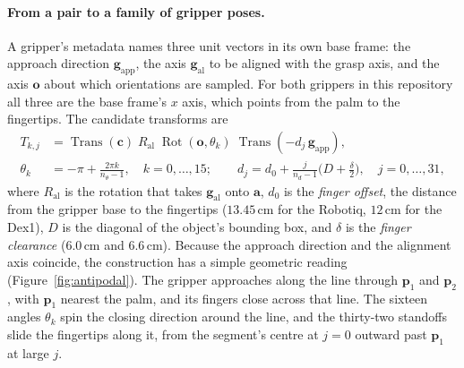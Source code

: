 \documentclass{article}
\begin{document}
\paragraph{From a pair to a family of gripper poses.}
A gripper's metadata names three unit vectors in its own base frame: the approach direction $\bm g_{\mathrm{app}}$, the axis $\bm g_{\mathrm{al}}$ to be aligned with the grasp axis, and the axis $\bm o$ about which orientations are sampled. For both grippers in this repository all three are the base frame's $x$ axis, which points from the palm to the fingertips. The candidate transforms are
\begin{align}
  T_{k,j} &= \operatorname{Trans}(\bm c)\; R_{\mathrm{al}}\; \operatorname{Rot}(\bm o,\theta_k)\; \operatorname{Trans}(-d_j\,\bm g_{\mathrm{app}}), \label{eq:candidate}\\
  \theta_k &= -\pi + \frac{2\pi k}{n_\theta-1},\quad k=0,\dots,15; \qquad
  d_j = d_0 + \frac{j}{n_d-1}\Big(D+\tfrac{\delta}{2}\Big),\quad j=0,\dots,31, \nonumber
\end{align}
where $R_{\mathrm{al}}$ is the rotation that takes $\bm g_{\mathrm{al}}$ onto $\bm a$, $d_0$ is the \emph{finger offset}, the distance from the gripper base to the fingertips ($13.45$\,cm for the Robotiq, $12$\,cm for the Dex1), $D$ is the diagonal of the object's bounding box, and $\delta$ is the \emph{finger clearance} ($6.0$\,cm and $6.6$\,cm). Because the approach direction and the alignment axis coincide, the construction has a simple geometric reading (Figure~\ref{fig:antipodal}). The gripper approaches along the line through $\bm p_1$ and $\bm p_2$, with $\bm p_1$ nearest the palm, and its fingers close across that line. The sixteen angles $\theta_k$ spin the closing direction around the line, and the thirty-two standoffs slide the fingertips along it, from the segment's centre at $j=0$ outward past $\bm p_1$ at large $j$.
\end{document}
